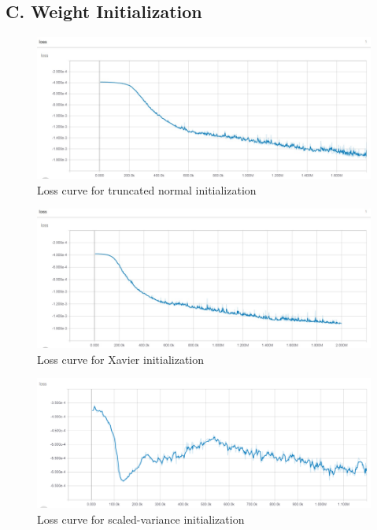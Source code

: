\documentclass[11pt]{paper}
\begin{document}
	\subsection*{C. Weight Initialization}
			\begin{figure}[h]
			\centering  
			\includegraphics[width=0.7\linewidth]{initialization1.png} 
			\caption{Loss curve for truncated normal initialization}   
		\end{figure}
			\begin{figure}[H]%
			\centering  
			\includegraphics[width=0.7\linewidth]{initialization2.png} 
			\caption{Loss curve for Xavier initialization} 
		\end{figure}
			\begin{figure}[H]
			\centering  
			\includegraphics[width=0.7\linewidth]{initialization3.png} 
			\caption{Loss curve for scaled-variance initialization} 
		\end{figure}
\end{document}
